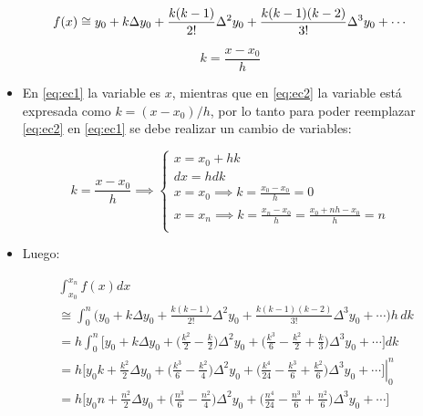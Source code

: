 \documentclass[openany]{book}
\providecommand{\tightlist}{%
  \setlength{\itemsep}{0pt}\setlength{\parskip}{0pt}}
\begin{document}
\begin{equation}
\label{eq:ec2}
f(x) \cong y_0 + k \Delta y_0 + \frac{k(k-1)}{2!}\Delta^2 y_0 \\
+ \frac{k(k-1)(k-2)}{3!}\Delta^3 y_0 + \cdots
\end{equation}

\[
k = \frac{x-x_0}{h}
\]

\begin{itemize}
\tightlist
\item
  En \eqref{eq:ec1} la variable es \(x\), mientras que en \eqref{eq:ec2} la variable está expresada como \(k = (x - x_0)/h\), por lo tanto para poder reemplazar \eqref{eq:ec2} en \eqref{eq:ec1} se debe realizar un cambio de variables:
\end{itemize}

\[
k = \frac{x-x_0}{h} \implies
\begin{cases}
x = x_0 + hk \\
dx = hdk \\
x = x_0 \implies k = \frac{x_0-x_0}{h} = 0 \\
x = x_n \implies k = \frac{x_n-x_0}{h} = \frac{x_0 + nh -x_0}{h} =n \\
\end{cases}
\]

\begin{itemize}
\tightlist
\item
  Luego:
\end{itemize}

\[
\begin{aligned}
& \int_{x_0}^{x_n} f(x)dx \\
& \cong \int_{0}^{n} \Big( y_0 + k \Delta y_0 + \frac{k(k-1)}{2!}\Delta^2 y_0 + \frac{k(k-1)(k-2)}{3!}\Delta^3 y_0 + \cdots \Big) h\,dk \\
& = h \int_{0}^{n} \Big[ y_0 + k \Delta y_0 + \Big( \frac{k^2}{2} - \frac{k}{2} \Big) \Delta^2 y_0 + \Big( \frac{k^3}{6} - \frac{k^2}{2} + \frac{k}{3} \Big) \Delta^3 y_0  + \cdots \Big] dk \\
&= h \Big[ 
\left.
y_0 k + \frac{k^2}{2} \Delta y_0 + \Big( \frac{k^3}{6} - \frac{k^2}{4} \Big) \Delta^2 y_0 + \Big( \frac{k^4}{24} - \frac{k^3}{6} + \frac{k^2}{6} \Big) \Delta^3 y_0  + \cdots
\Big] \right\vert_{0}^{n} \\
&= h \Big[ y_0 n + \frac{n^2}{2} \Delta y_0 + \Big( \frac{n^3}{6} - \frac{n^2}{4} \Big) \Delta^2 y_0 + \Big( \frac{n^4}{24} - \frac{n^3}{6} + \frac{n^2}{6} \Big) \Delta^3 y_0  + \cdots
\Big]
\end{aligned}
\]
\end{document}
